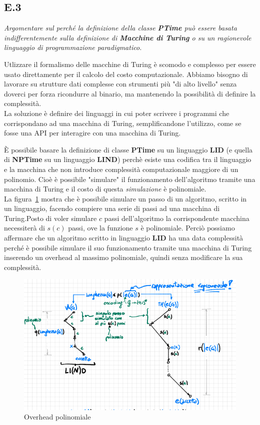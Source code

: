 \documentclass[a4paper]{article}
\begin{document}
\subsection{E.3}
\emph{Argomentare sul perché la definizione della classe \textbf{PTime} può essere basata indifferentemente sulla definizione di \textbf{Macchine di Turing} o su un ragionevole linguaggio di programmazione paradigmatico.}


Utlizzare il formalismo delle macchine di Turing è scomodo e complesso per essere usato direttamente per il calcolo del costo computazionale.
Abbiamo bisogno di lavorare su strutture dati complesse con strumenti più "di alto livello" senza doverci per forza ricondurre al binario, ma mantenendo la possibilità di definire la complessità.\\
La soluzione è definire dei linguaggi in cui poter scrivere i programmi che corrispondano ad una macchina di Turing, semplificandone l'utilizzo, come se fosse una API per interagire con una macchina di Turing.

È possibile basare la definizione di classe \textbf{PTime} su un linguaggio \textbf{LID} (e quella di \textbf{NPTime} su un linguaggio \textbf{LIND}) perchè esiste una codifica tra il linguaggio e la macchina che non introduce complessità computazionale maggiore di un polinomio.
Cioè è possibile "simulare" il funzionamento dell'algoritmo tramite una macchina di Turing e il costo di questa \textit{simulazione} è polinomiale.\\
La figura~\ref{FIG:E3} mostra che è possibile simulare un passo di un algoritmo, scritto in un linguaggio, facendo compiere una serie di passi ad una macchina di Turing.Posto di voler simulare $c$ passi dell'algoritmo la corrispondente macchina necessiterà di $s(c)$ passi, ove la funzione $s$ è polinomiale.
Perciò possiamo affermare che un algoritmo scritto in linguaggio \textbf{LID} ha una data complessità perché è possibile simulare il suo funzionamento tramite una macchina di Turing inserendo un overhead al massimo polinomiale, quindi senza modificare la sua complessità.
\begin{figure}[!ht]
\centering
\includegraphics[width = 1\textwidth]{./img/E3.png}
\caption{Overhead polinomiale} \label{FIG:E3}
\end{figure}\\
\end{document}

